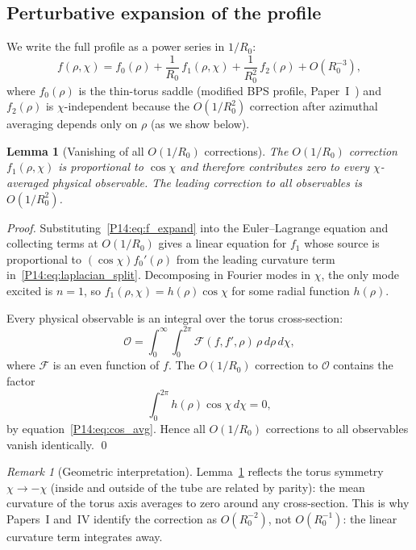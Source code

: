 \documentclass[11pt,a4paper]{article}
\newtheorem{lemma}[theorem]{Lemma}
\theoremstyle{definition}
\theoremstyle{remark}
\newtheorem{remark}[theorem]{Remark}
\newcommand{\fzero}{f_0}
\newcommand{\ftwo}{f_2}
\newcommand{\Rzero}{R_0}
\begin{document}
\subsection{Perturbative expansion of the profile}

We write the full profile as a power series in $1/\Rzero$:
\begin{equation}
  f(\rho,\chi) = \fzero(\rho)
  + \frac{1}{\Rzero}\,f_1(\rho,\chi)
  + \frac{1}{\Rzero^2}\,\ftwo(\rho)
  + O(\Rzero^{-3}),
  \label{P14:eq:f_expand}
\end{equation}
where $\fzero(\rho)$ is the thin-torus saddle (modified BPS profile,
Paper~I~\cite{Paper1}) and $\ftwo(\rho)$ is $\chi$-independent
because the $O(1/\Rzero^2)$ correction after azimuthal averaging
depends only on $\rho$ (as we show below).

\begin{lemma}[Vanishing of all $O(1/\Rzero)$ corrections]
\label{P14:lem:O1R_vanishes}
The $O(1/\Rzero)$ correction $f_1(\rho,\chi)$ is proportional to $\cos\chi$
and therefore contributes zero to every $\chi$-averaged physical observable.
The leading correction to all observables is $O(1/\Rzero^2)$.
\end{lemma}

\begin{proof}
Substituting~\eqref{P14:eq:f_expand} into the Euler--Lagrange equation and
collecting terms at $O(1/\Rzero)$ gives a linear equation for $f_1$
whose source is proportional to $(\cos\chi)\fzero'(\rho)$ from the
leading curvature term in~\eqref{P14:eq:laplacian_split}.
Decomposing in Fourier modes in $\chi$, the only mode excited is $n=1$,
so $f_1(\rho,\chi)=h(\rho)\cos\chi$ for some radial function $h(\rho)$.

Every physical observable is an integral over the torus cross-section:
\begin{equation}
  \mathcal{O} = \int_0^\infty\!\!\int_0^{2\pi}
  \mathcal{F}(f,f',\rho)\,\rho\,d\rho\,d\chi,
\end{equation}
where $\mathcal{F}$ is an even function of $f$.
The $O(1/\Rzero)$ correction to $\mathcal{O}$ contains the factor
\begin{equation}
  \int_0^{2\pi} h(\rho)\cos\chi\,d\chi = 0,
  \label{P14:eq:cos_integral}
\end{equation}
by equation~\eqref{P14:eq:cos_avg}.
Hence all $O(1/\Rzero)$ corrections to all observables vanish identically.
\qed
\end{proof}

\begin{remark}[Geometric interpretation]
\label{P14:rem:geometric_interp}
Lemma~\ref{P14:lem:O1R_vanishes} reflects the torus symmetry $\chi\to-\chi$
(inside and outside of the tube are related by parity):
the mean curvature of the torus axis averages to zero around any cross-section.
This is why Papers~I and~IV identify the correction as $O(\Rzero^{-2})$,
not $O(\Rzero^{-1})$: the linear curvature term integrates away.
\end{remark}
\end{document}
